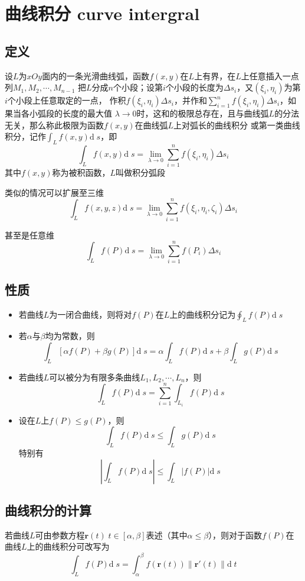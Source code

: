 \documentclass[UTF8]{ctexart}
\newcommand{\dif}[1]{{\mathrm{d}\;\!#1}}
\newcommand{\ve}[1]{{\bm{#1}}}
\newcommand{\abs}[1]{{\left|{#1}\right|}}
\newcommand{\norm}[1]{{\left\|#1\right\|}}
\newcommand{\emplin}{\vspace{1em}}
\begin{document}
\section*{曲线积分 curve intergral}
\subsection*{定义}
设$L$为$xOy$面内的一条光滑曲线弧，函数$f(x,y)$在$L$上有界，在$L$上任意插入一点列$M_1,M_2,\cdots,M_{n-1}$
把$L$分成$n$个小段；设第$i$个小段的长度为$\Delta s_i$，又$(\xi_i,\eta_i)$为第$i$个小段上任意取定的一点，
作积$f(\xi_i,\eta_i)\Delta s_i$，并作和$\sum^n_{i=1}f(\xi_i,\eta_i)\Delta s_i$，如果当各小弧段的长度的最大值
$\lambda\to0$时，这和的极限总存在，且与曲线弧$L$的分法无关，那么称此极限为函数$f(x,y)$在曲线弧$L$上对弧长的曲线积分
或第一类曲线积分，记作$\int_Lf(x,y)\dif{s}$，即
\[\int_Lf(x,y)\dif{s}=\lim_{\lambda\to0}\sum^n_{i=1}f(\xi_i,\eta_i)\Delta s_i\]
其中$f(x,y)$称为被积函数，$L$叫做积分弧段

\emplin

类似的情况可以扩展至三维
\[\int_Lf(x,y,z)\dif{s}=\lim_{\lambda\to0}\sum^n_{i=1}f(\xi_i,\eta_i,\zeta_i)\Delta s_i\]

甚至是任意维
\[\int_Lf(P)\dif{s}=\lim_{\lambda\to0}\sum^n_{i=1}f(P_i)\Delta s_i\]

\emplin

\subsection*{性质}
\begin{itemize}
  \item 若曲线$L$为一闭合曲线，则将对$f(P)$在$L$上的曲线积分记为$\displaystyle \oint_Lf(P)\dif{s}$
  \item 若$\alpha$与$\beta$均为常数，则
  \[\int_L[\alpha f(P)+\beta g(P)]\dif{s}=\alpha\int_Lf(P)\dif{s}+\beta\int_Lg(P)\dif{s}\]
  \item 若曲线$L$可以被分为有限多条曲线$L_1,L_2,\cdots,L_n$，则
  \[ \int_Lf(P)\dif{s}=\sum^n_{i=1}\int_{L_i}f(P)\dif{s} \]
  \item 设在$L$上$f(P)\le g(P)$，则
  \[\int_Lf(P)\dif{s}\le\int_Lg(P)\dif{s}\]
  特别有
  \[\abs{\int_Lf(P)\dif{s}}\le\int_L\abs{f(P)}\dif{s}\]
\end{itemize}

\emplin

\subsection*{曲线积分的计算}
若曲线$L$可由参数方程$\ve{r}(t)\;t\in[\alpha,\beta]$表述（其中$\alpha\le\beta$），则对于函数$f(P)$在曲线$L$上的曲线积分可改写为
\[\int_Lf(P)\dif{s}=\int_\alpha^\beta f(\ve{r}(t))\norm{\ve{r}'(t)}\dif{t}\]
\end{document}
